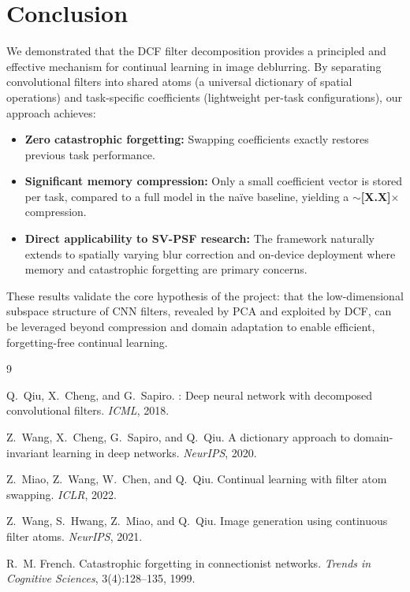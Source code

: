 \documentclass[11pt,letterpaper]{article}
\begin{document}
\section{Conclusion}
\label{sec:conclusion}

We demonstrated that the DCF filter decomposition provides a principled and
effective mechanism for continual learning in image deblurring.  By separating
convolutional filters into shared atoms (a universal dictionary of spatial
operations) and task-specific coefficients (lightweight per-task
configurations), our approach achieves:

\begin{itemize}[leftmargin=*]
    \item \textbf{Zero catastrophic forgetting:}  Swapping coefficients exactly
          restores previous task performance.
    \item \textbf{Significant memory compression:}  Only a small coefficient
          vector is stored per task, compared to a full model in the na\"ive
          baseline, yielding a $\sim$\textbf{[X.X]}$\times$ compression.
    \item \textbf{Direct applicability to SV-PSF research:}  The framework
          naturally extends to spatially varying blur correction and
          on-device deployment where memory and catastrophic forgetting are
          primary concerns.
\end{itemize}

These results validate the core hypothesis of the project: that the
low-dimensional subspace structure of CNN filters, revealed by PCA and
exploited by DCF, can be leveraged beyond compression and domain adaptation
to enable efficient, forgetting-free continual learning.

\begin{thebibliography}{9}

Q.~Qiu, X.~Cheng, and G.~Sapiro.
: Deep neural network with decomposed convolutional filters.
\newblock \emph{ICML}, 2018.

Z.~Wang, X.~Cheng, G.~Sapiro, and Q.~Qiu.
\newblock A dictionary approach to domain-invariant learning in deep networks.
\newblock \emph{NeurIPS}, 2020.

Z.~Miao, Z.~Wang, W.~Chen, and Q.~Qiu.
\newblock Continual learning with filter atom swapping.
\newblock \emph{ICLR}, 2022.

Z.~Wang, S.~Hwang, Z.~Miao, and Q.~Qiu.
\newblock Image generation using continuous filter atoms.
\newblock \emph{NeurIPS}, 2021.

R.~M. French.
\newblock Catastrophic forgetting in connectionist networks.
\newblock \emph{Trends in Cognitive Sciences}, 3(4):128--135, 1999.

\end{thebibliography}
\end{document}
